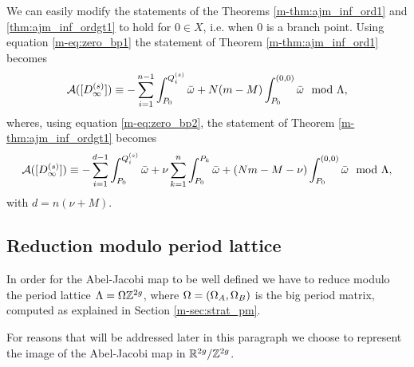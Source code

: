 \documentclass[main.tex]{subfiles}
\begin{document}
    \begin{rmk}\label{rmk:zero_bp}
     We can easily modify the statements of the Theorems \ref{m-thm:ajm_inf_ord1} and \ref{thm:ajm_inf_ordgt1} to hold for
     $0 \in X$, i.e. when $0$ is a branch point. 
     Using equation \eqref{m-eq:zero_bp1} the statement of Theorem \ref{m-thm:ajm_inf_ord1} becomes
      \begin{equation}\label{eq:ajm_int_ord0}
       \mathcal{A}( [D_{\infty}^{(s)}] ) \equiv -\sum_{i = 1}^{n-1} \int_{P_0}^{Q_i^{(s)}} \bar{\omega} + N(m-M) \int_{P_0}^{(0,0)} \bar{\omega} \mod \Lambda,
    \end{equation}
    wheres, using equation \eqref{m-eq:zero_bp2}, the statement of Theorem \ref{m-thm:ajm_inf_ordgt1} becomes
      \begin{equation}\label{eq:ajm_int_ord0}
       \mathcal{A}( [D_{\infty}^{(s)}] ) \equiv -\sum_{i = 1}^{d-1} \int_{P_0}^{Q_i^{(s)}} \bar{\omega} + \nu \sum_{k=1}^n
      \int_{P_0}^{P_k} \bar{\omega} + (Nm-M-\nu) \int_{P_0}^{(0,0)} \bar{\omega} \mod \Lambda,
    \end{equation}
    with $d = n(\nu+M)$.
    \end{rmk}

  \subsection{Reduction modulo period lattice}\label{subsec:lat_red}

    In order for the Abel-Jacobi map to be well defined we have to reduce modulo the period lattice $\Lambda = 
  \Omega\mathbb{Z}^{2g}$, where $\Omega = (\Omega_A, \Omega_B)$ is the big period matrix, computed as explained in
  Section \ref{m-sec:strat_pm}.
   
   For reasons that will be addressed later in this paragraph
   we choose to
   represent the image of the Abel-Jacobi map in 
    $\mathbb{R}^{2g} / \mathbb{Z}^{2g}$.
    
\end{document}
